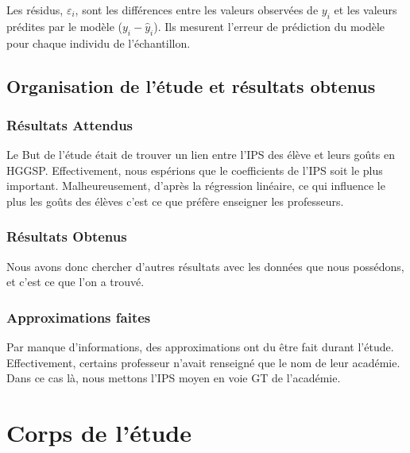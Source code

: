 \documentclass[a4paper, 11pt]{article}
\begin{document}
Les résidus, \(\varepsilon_i\), sont les différences entre les valeurs observées de \(y_i\) et les valeurs prédites par le modèle (\(y_i - \hat{y}_i\)). Ils mesurent l'erreur de prédiction du modèle pour chaque individu de l'échantillon.

\subsection{Organisation de l'étude et résultats obtenus}
\subsubsection{Résultats Attendus}

Le But de l'étude était de trouver un lien entre l'IPS des élève et leurs goûts en HGGSP. Effectivement, nous espérions que le coefficients de l'IPS soit le plus important. Malheureusement, d'après la régression linéaire, ce qui influence le plus les goûts des élèves c'est ce que préfère enseigner les professeurs.

\subsubsection{Résultats Obtenus}

Nous avons donc chercher d'autres résultats avec les données que nous possédons, et c'est ce que l'on a trouvé.


\subsubsection{Approximations faites}
Par manque d'informations, des approximations ont du être fait durant l'étude. Effectivement, certains professeur n'avait renseigné que le nom de leur académie. Dans ce cas là, nous mettons l'IPS moyen en voie GT de l'académie.

\newpage

\section{Corps de l'étude}
\end{document}
